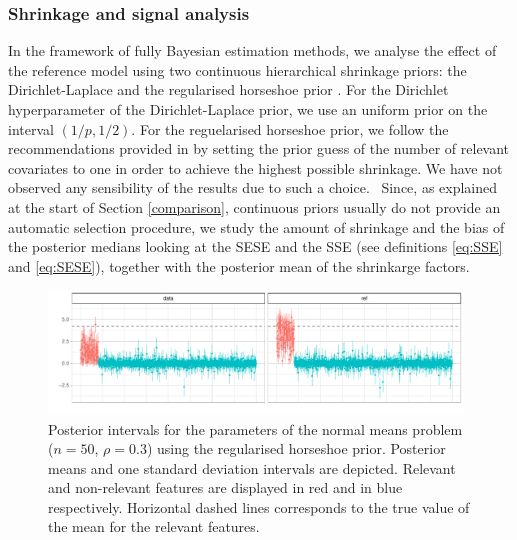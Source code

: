 \documentclass[american,]{article}
\theoremstyle{definition}
\begin{document}
\hypertarget{shrinkage-signal}{%
\subsubsection{Shrinkage and signal analysis}\label{shrinkage-signal}}
In the framework of fully Bayesian estimation methods, we analyse the effect of the reference model using two continuous hierarchical shrinkage priors: the Dirichlet-Laplace \citep{paper:dirichlet_laplace} and the regularised horseshoe prior \citep{paper:rhs}. 
For the Dirichlet hyperparameter of the Dirichlet-Laplace prior, we use an uniform prior on the interval $(1/p,1/2)$. For the reguelarised horseshoe prior, we follow the recommendations provided in \cite{paper:rhs} by setting the prior guess of the number of relevant covariates to one in order to achieve the highest possible shrinkage. We have not observed any sensibility of the results due to such a choice.
\
Since, as explained at the start of Section \ref{comparison}, continuous priors usually do not provide an automatic selection procedure, we study the amount of shrinkage and the bias of the posterior medians looking at the SESE and the SSE (see definitions \eqref{eq:SSE} and \eqref{eq:SESE}), together with the posterior mean of the shrinkarge factors. 

\begin{figure}[tp]
  \centering
  \includegraphics[width=0.98\textwidth]{graphics/post_int.pdf}
  \caption{Posterior intervals for the parameters of the normal means problem ($n=50$, $\rho=0.3$) using the regularised horseshoe prior. Posterior means and one standard deviation intervals are depicted. Relevant and non-relevant features are displayed in red and in blue respectively. Horizontal dashed lines corresponds to the true value of the mean for the relevant features.\\}
  \label{fig:posterior_intervals}
\end{figure}
\end{document}
